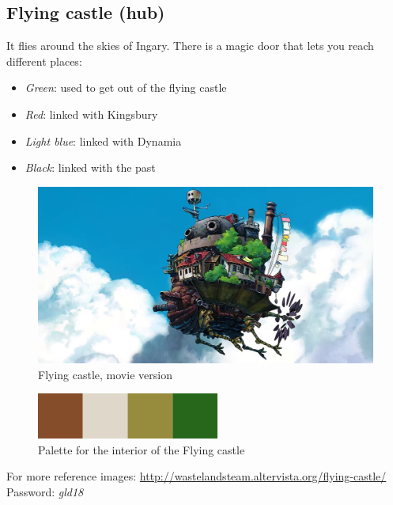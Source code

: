 \subsection{Flying castle (hub)}
It flies around the skies of Ingary. There is a magic door that lets you reach different places:
\begin{itemize}
	\item \textit{Green}: used to get out of the flying castle
	\item \textit{Red}: linked with Kingsbury
	\item \textit{Light blue}: linked with Dynamia
	\item \textit{Black}: linked with the past
\end{itemize}
\begin{figure}[H]
  \centering
  \includegraphics[width=12cm]{../Images/Locations/flyingCastle}
  \caption{Flying castle, movie version}
\end{figure}

\begin{figure}[H]
  \centering
  \includegraphics[width=6cm]{Images/Palettes/flyingCastle}
  \caption{Palette for the interior of the Flying castle}
\end{figure}

For more reference images: \url{http://wastelandsteam.altervista.org/flying-castle/} \\
Password: \textit{gld18}

\pagebreak

